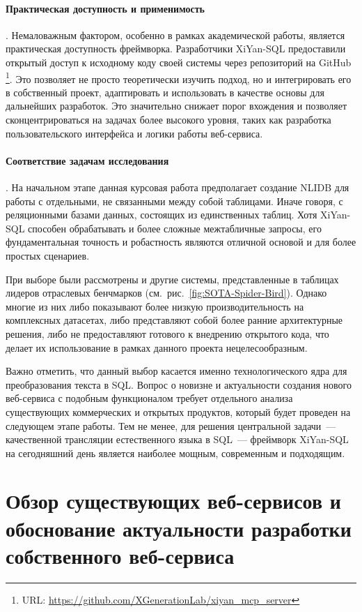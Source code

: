 \paragraph{Практическая доступность и применимость}. Немаловажным фактором,
особенно в рамках академической работы, является практическая доступность фреймворка.
Разработчики XiYan-SQL предоставили открытый доступ к исходному коду своей системы
через репозиторий на GitHub \footnote{URL: \url{https://github.com/XGenerationLab/xiyan_mcp_server}}. 
Это позволяет не просто теоретически изучить подход,
но и интегрировать его в собственный проект, адаптировать и использовать в качестве
основы для дальнейших разработок. Это значительно снижает порог вхождения и позволяет
сконцентрироваться на задачах более высокого уровня, таких как разработка
пользовательского интерфейса и логики работы веб-сервиса.

\paragraph{Соответствие задачам исследования}. На начальном этапе данная
курсовая работа предполагает создание NLIDB для работы с отдельными,
не связанными между собой таблицами. Иначе говоря, с реляционными базами данных, 
состоящих из единственных таблиц. Хотя XiYan-SQL способен обрабатывать и
более сложные межтабличные запросы,
его фундаментальная точность и робастность являются отличной основой и для более
простых сценариев.

При выборе были рассмотрены и другие системы,
представленные в таблицах лидеров отраслевых бенчмарков (см.~рис.~\ref{fig:SOTA-Spider-Bird}).
Однако многие из них либо показывают более низкую производительность на
комплексных датасетах, либо представляют собой более ранние архитектурные решения,
либо не предоставляют готового к внедрению открытого кода, что делает их
использование в рамках данного проекта нецелесообразным.

Важно отметить, что данный выбор касается именно технологического ядра
для преобразования текста в SQL. Вопрос о новизне и актуальности создания
нового веб-сервиса с подобным функционалом требует отдельного анализа
существующих коммерческих и открытых продуктов, который будет проведен
на следующем этапе работы. Тем не менее, для решения центральной
задачи~--- качественной трансляции естественного языка в SQL~--- фреймворк
XiYan-SQL на сегодняшний день является наиболее мощным, современным и подходящим.




\section{Обзор существующих веб-сервисов и обоснование актуальности разработки собственного веб-сервиса}

